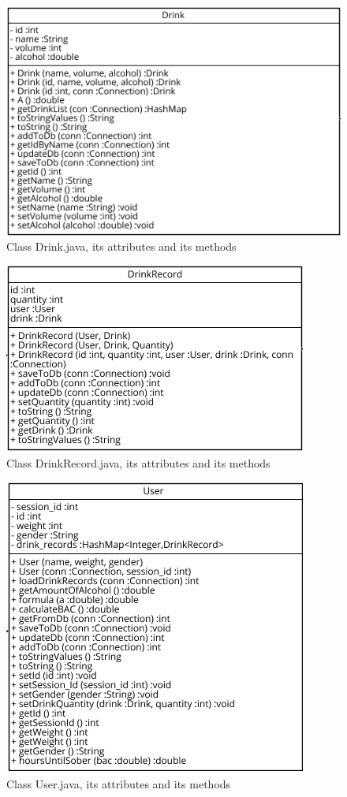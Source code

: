 \begin{figure}[H]
\centering
   \includegraphics{./figures/drink.png}
   \caption{Class Drink.java, its attributes and its methods}
   \label{fig:drinkJava}
\end{figure}

\begin{figure}[H]
\centering
   \includegraphics{./figures/drinkRecord.png}
   \caption{Class DrinkRecord.java, its attributes and its methods}
   \label{fig:drinkRecordJava}
\end{figure}

\begin{figure}[H]
\centering
   \includegraphics{./figures/user.png}
   \caption{Class User.java, its attributes and its methods}
   \label{fig:userJava}
\end{figure}


